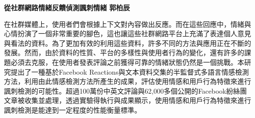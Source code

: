 \setcounter{page}{2}
\begin{center}
    \textbf{\Large{從社群網路情緒反饋偵測諷刺情緒}}
    \vskip 0.5cm
    \textbf{\Large{郭柏辰}}
\end{center}
在社群媒體上，使用者們會根據上下文對內容做出反應。而在這些回應中，情緒與心情扮演了一個非常重要的腳色，這也讓這些社群網路平台上充滿了表達個人意見與看法的資料。為了更加有效的利用這些資料，許多不同的方法與應用正在不斷的發展。然而，由於資料的性質、平台的多樣性與使用者行為的變化，還有許多的課題必須去克服，在使用者發表評論之前獲得可靠的情緒狀態仍然是一個挑戰。本研究提出了一種基於Facebook Reactions與文本資料交集的半監督式多語言情感檢測方法，利用由此情感檢測方法所產生的成果，評估使用情感和用戶行為特徵來進行諷刺檢測的可能性。超過100萬份中英文評論與62,000多個公開的Facebook紛絲團文章被收集並處理，透過實驗得執行與成果顯示，使用情感和用戶行為特徵來進行諷刺檢測是能達到一定程度的性能衡量標準。

\clearpage
